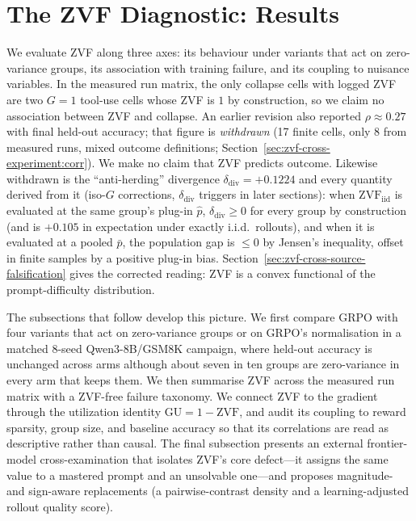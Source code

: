 \section{The ZVF Diagnostic: Results}
\label{sec:p2-results}
We evaluate ZVF along three axes: its behaviour under variants that act on
zero-variance groups, its association with training failure, and its coupling to
nuisance variables. In the measured run matrix, the only collapse cells with
logged ZVF are two $G{=}1$ tool-use cells whose ZVF is $1$ by construction, so we
claim no association between ZVF and collapse. An earlier
revision also reported $\rho \approx 0.27$ with final held-out accuracy; that
figure is \emph{withdrawn} (17 finite cells, only 8 from measured runs, mixed
outcome definitions; Section~\ref{sec:zvf-cross-experiment:corr}). We make no
claim that ZVF predicts outcome. Likewise withdrawn is the ``anti-herding''
divergence $\delta_{\mathrm{div}}=+0.1224$ and every quantity derived from it
(iso-$G$ corrections, $\delta_{\mathrm{div}}$ triggers in later sections): when
$\mathrm{ZVF}_{\mathrm{iid}}$ is evaluated at the same group's plug-in $\hat p$,
$\delta_{\mathrm{div}}\ge0$ for every group by construction (and is $+0.105$ in
expectation under exactly i.i.d.\ rollouts), and when it is evaluated at a pooled
$\bar p$, the population gap is $\le0$ by Jensen's inequality, offset in
finite samples by a positive plug-in bias.
Section~\ref{sec:zvf-cross-source-falsification} gives the corrected reading: ZVF
is a convex functional of the prompt-difficulty distribution.

The subsections that follow develop this picture. We first compare GRPO with
four variants that act on zero-variance groups or on GRPO's normalisation in a
matched 8-seed Qwen3-8B/GSM8K campaign, where held-out accuracy is unchanged
across arms although about seven in ten groups are zero-variance in every arm that
keeps them. We then summarise ZVF across the measured run matrix with a
ZVF-free failure taxonomy. We connect ZVF to
the gradient through the utilization identity $\mathrm{GU} = 1 - \mathrm{ZVF}$, and
audit its coupling to reward sparsity, group size, and baseline accuracy so that
its correlations are read as descriptive rather than causal. The final subsection
presents an external frontier-model cross-examination that isolates ZVF's core
defect---it assigns the same value to a mastered prompt and an unsolvable one---and
proposes magnitude- and sign-aware replacements (a pairwise-contrast density and a
learning-adjusted rollout quality score).
